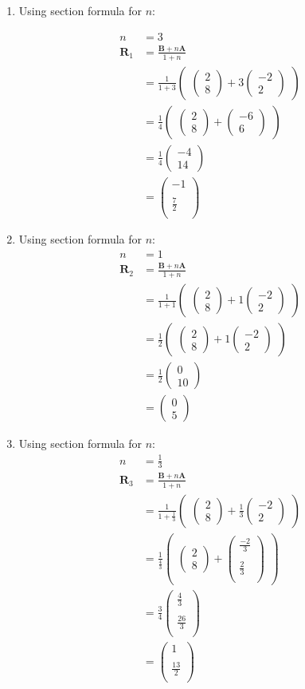 \documentclass[12pt]{article}
\newcommand{\myvec}[1]{\ensuremath{\begin{pmatrix}#1\end{pmatrix}}}
\let\vec\mathbf
\begin{document}
\begin{enumerate}

\item Using section formula for $n$:
    
\begin{align}
n&=3\\
\vec{R}_1&=\frac{\vec{B}+n\vec{A}}{1+n}\\
&=\frac{1}{1+3}  \myvec{\myvec{
2\\
8
}
  +
   3\myvec{
-2\\
2
}}\\
&= \frac{1}{4} \myvec{\myvec{
2\\
8
}
  +
\myvec{
-6\\
6
}} \\
&=\frac{1}{4}
\myvec{
-4\\
14
}\\
&=\myvec{
-1\\
\\
\frac{7}{2}\\
}
\end{align}

\item Using section formula for $n$:
\begin{align}
n&=1\\
\vec{R}_2&=\frac{\vec{B}+n\vec{A}}{1+n}\\
&=\frac{1}{1+1}  \myvec{\myvec{
2\\
8
}
  +
   1\myvec{
-2\\
2
}}\\
&= \frac{1}{2} \myvec{\myvec{
2\\
8
}
  +1\myvec{
-2\\
2
}} \\
&=\frac{1}{2}
\myvec{
0\\
10
}\\
&=\myvec{
0\\
5
}
\end{align}

\item Using section formula for $n$:
\begin{align}
n&=\frac{1}{3}\\
\vec{R}_3&=\frac{\vec{B}+n\vec{A}}{1+n}\\
&=\frac{1}{1+\frac{1}{3}}  \myvec{\myvec{
2\\
8
}
  +
   \frac{1}{3}\myvec{
-2\\
2
}}\\
&= \frac{1}{\frac{4}{3}} \myvec{\myvec{
2\\
8
}
  +
\myvec{
\frac{-2}{3}\\
\\
\frac{2}{3}\\
}} \\
&=\frac{3}{4}
\myvec{
\frac{4}{3}\\
\\
\frac{26}{3}\\
}\\
&=\myvec{
1\\
\\
\frac{13}{2}\\
}
\end{align}

\end{enumerate}
\end{document}
